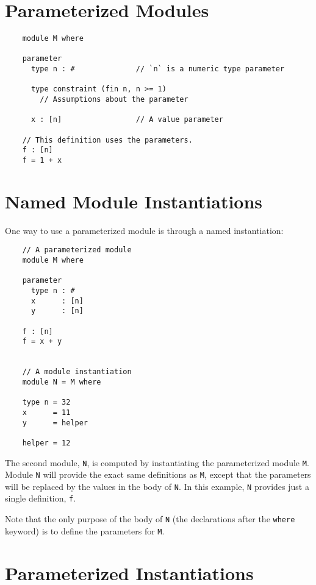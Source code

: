 \section{Parameterized Modules}

\begin{verbatim}
    module M where

    parameter
      type n : #              // `n` is a numeric type parameter

      type constraint (fin n, n >= 1)
        // Assumptions about the parameter

      x : [n]                 // A value parameter

    // This definition uses the parameters.
    f : [n]
    f = 1 + x
\end{verbatim}


\section{Named Module Instantiations}

One way to use a parameterized module is through a named instantiation:

\begin{verbatim}
    // A parameterized module
    module M where

    parameter
      type n : #
      x      : [n]
      y      : [n]

    f : [n]
    f = x + y


    // A module instantiation
    module N = M where

    type n = 32
    x      = 11
    y      = helper

    helper = 12
\end{verbatim}

The second module, \texttt{N}, is computed by instantiating the parameterized
module \texttt{M}.  Module \texttt{N} will provide the exact same definitions as \texttt{M},
except that the parameters will be replaced by the values in the body
of \texttt{N}.   In this example, \texttt{N} provides just a single definition, \texttt{f}.

Note that the only purpose of the body of \texttt{N} (the declarations
after the \texttt{where} keyword) is to define the parameters for \texttt{M}.


\section{Parameterized Instantiations}

